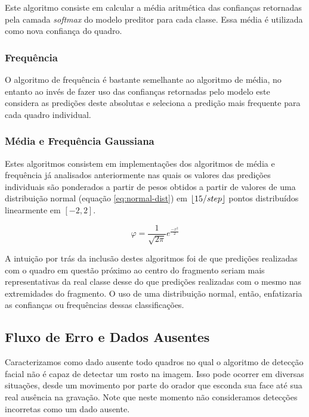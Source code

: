 Este algoritmo consiste em calcular a média aritmética das confianças retornadas pela camada \textit{softmax} do modelo preditor para cada classe.
Essa média é utilizada como nova confiança do quadro.

\subsubsection{Frequência}

O algoritmo de frequência é bastante semelhante ao algoritmo de média, no entanto ao invés de fazer uso das confianças retornadas pelo modelo este considera as predições deste absolutas e seleciona a predição mais frequente para cada quadro individual.

\subsubsection{Média e Frequência Gaussiana}

Estes algoritmos consistem em implementações dos algoritmos de média e frequência já analisados anteriormente nas quais os valores das predições individuais são ponderados a partir de pesos obtidos a partir de valores de uma distribuição normal (equação \ref{eq:normal-dist}) em $\left\lfloor 15 / step \right\rfloor$ pontos distribuídos linearmente em $[-2, 2]$.

\begin{equation}\label{eq:normal-dist}
    \varphi = \frac{1}{\sqrt{2\pi}} e ^ {\frac{-x^2}{2}}
\end{equation}

A intuição por trás da inclusão destes algoritmos foi de que predições realizadas com o quadro em questão próximo ao centro do fragmento seriam mais representativas da real classe desse do que predições realizadas com o mesmo nas extremidades do fragmento.
O uso de uma distribuição normal, então, enfatizaria as confianças ou frequências dessas classificações.

\subsection{Fluxo de Erro e Dados Ausentes}
\label{sec:missing-data}

Caracterizamos como dado ausente todo quadros no qual o algoritmo de detecção facial não é capaz de detectar um rosto na imagem.
Isso pode ocorrer em diversas situações, desde um movimento por parte do orador que esconda sua face até sua real ausência na gravação.
Note que neste momento não consideramos detecções incorretas como um dado ausente.

